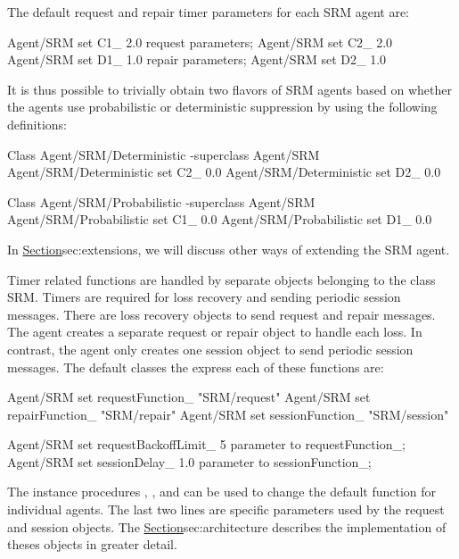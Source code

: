 The default request and repair timer parameters \cite{Floy95:Reliable}
for each SRM agent are:
\begin{program}
        Agent/SRM set C1_       2.0 \; request parameters;
        Agent/SRM set C2_       2.0
        Agent/SRM set D1_       1.0 \; repair parameters;
        Agent/SRM set D2_       1.0
\end{program}
It is thus possible to trivially obtain two flavors of SRM agents
based on whether the agents use probabilistic or deterministic
suppression by using the following definitions:
\begin{program}
        Class Agent/SRM/Deterministic -superclass Agent/SRM
        Agent/SRM/Deterministic set C2_ 0.0
        Agent/SRM/Deterministic set D2_ 0.0

        Class Agent/SRM/Probabilistic -superclass Agent/SRM
        Agent/SRM/Probabilistic set C1_ 0.0
        Agent/SRM/Probabilistic set D1_ 0.0
\end{program}
In \href{a later section}{Section}{sec:extensions},
we will discuss other ways of extending the SRM agent.

Timer related functions are handled by separate objects
belonging to the class  SRM.
Timers are required for loss recovery and sending periodic session messages.
There are loss recovery objects to send request and repair messages.
The agent creates a separate request or repair object to handle each loss.
In contrast, the agent only creates one session object to send
periodic session messages.
The default classes the express each of these functions are:
\begin{program}
        Agent/SRM set requestFunction_  "SRM/request"
        Agent/SRM set repairFunction_   "SRM/repair"
        Agent/SRM set sessionFunction_  "SRM/session"

        Agent/SRM set requestBackoffLimit_      5       \; parameter to requestFunction_;
        Agent/SRM set sessionDelay_             1.0     \; parameter to sessionFunction_;
\end{program}
The instance procedures
,
,
and
can be used to change the default function for individual agents.
The last two lines are specific parameters used by the request 
and session objects.
The \href{following section}{Section}{sec:architecture}
describes the implementation of theses objects in greater detail.

